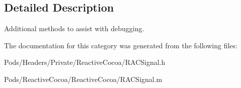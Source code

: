 \subsection{Detailed Description}
Additional methods to assist with debugging. 

The documentation for this category was generated from the following files\+:\begin{DoxyCompactItemize}
\item 
Pods/\+Headers/\+Private/\+Reactive\+Cocoa/R\+A\+C\+Signal.\+h\item 
Pods/\+Reactive\+Cocoa/\+Reactive\+Cocoa/R\+A\+C\+Signal.\+m\end{DoxyCompactItemize}
